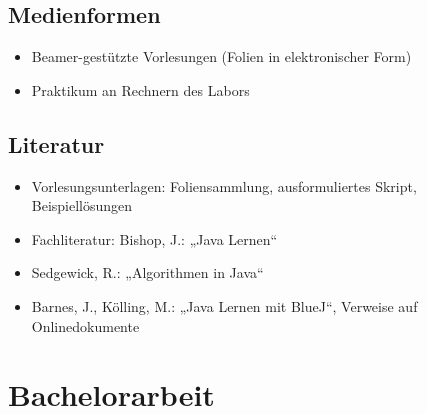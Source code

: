 \hypertarget{medienformenpathlabel....srcmodulbeschreibungen-bachelor-bpo5ba_algorithmenundprogrammierung2}{%
\section*{Medienformen\label{../../src/modulbeschreibungen-bachelor-bpo5/BA_AlgorithmenundProgrammierung2}}\label{medienformenpathlabel....srcmodulbeschreibungen-bachelor-bpo5ba_algorithmenundprogrammierung2}}

\begin{itemize}
\tightlist
\item
  Beamer-gestützte Vorlesungen (Folien in elektronischer Form)
\item
  Praktikum an Rechnern des Labors
\end{itemize}

\hypertarget{literaturpathlabel....srcmodulbeschreibungen-bachelor-bpo5ba_algorithmenundprogrammierung2}{%
\section*{Literatur\label{../../src/modulbeschreibungen-bachelor-bpo5/BA_AlgorithmenundProgrammierung2}}\label{literaturpathlabel....srcmodulbeschreibungen-bachelor-bpo5ba_algorithmenundprogrammierung2}}

\begin{itemize}
\tightlist
\item
  Vorlesungsunterlagen: Foliensammlung, ausformuliertes Skript,
  Beispiellösungen
\item
  Fachliteratur: Bishop, J.: „Java Lernen``
\item
  Sedgewick, R.: „Algorithmen in Java``
\item
  Barnes, J., Kölling, M.: „Java Lernen mit BlueJ``, Verweise auf
  Onlinedokumente
\end{itemize}

\hypertarget{bachelorarbeitpathlabel....srcmodulbeschreibungen-bachelor-bpo5ba_bachelorarbeit}{%
\chapter{Bachelorarbeit\label{../../src/modulbeschreibungen-bachelor-bpo5/BA_Bachelorarbeit}}\label{bachelorarbeitpathlabel....srcmodulbeschreibungen-bachelor-bpo5ba_bachelorarbeit}}

